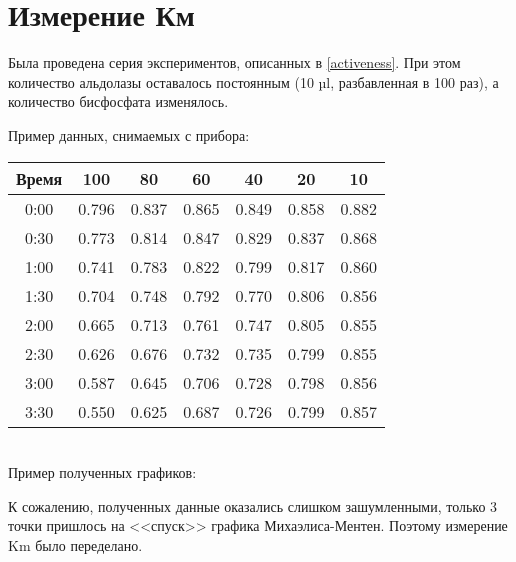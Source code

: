 \section{Измерение Км}
\label{Km-10}

Была проведена серия экспериментов, описанных в \ref{activeness}.
При этом количество альдолазы оставалось постоянным (10 µl, разбавленная в 100 раз),
а количество бисфосфата изменялось.

\def\svgwidth{\linewidth}

Пример данных, снимаемых с прибора:

\begin{tabular}{|c|c|c|c|c|c|c|}
\hline
Время & 100   &  80   &   60  & 40   & 20   &  10  \\
\hline
0:00  & 0.796 & 0.837 & 0.865 &0.849 &0.858 &0.882 \\
0:30  & 0.773 & 0.814 & 0.847 &0.829 &0.837 &0.868 \\
1:00  & 0.741 & 0.783 & 0.822 &0.799 &0.817 &0.860 \\
1:30  & 0.704 & 0.748 & 0.792 &0.770 &0.806 &0.856 \\
2:00  & 0.665 & 0.713 & 0.761 &0.747 &0.805 &0.855 \\
2:30  & 0.626 & 0.676 & 0.732 &0.735 &0.799 &0.855 \\
3:00  & 0.587 & 0.645 & 0.706 &0.728 &0.798 &0.856 \\
3:30  & 0.550 & 0.625 & 0.687 &0.726 &0.799 &0.857 \\
\hline
\end{tabular}\\

Пример полученных графиков:





К сожалению, полученных данные оказались слишком зашумленными,
только 3 точки пришлось на <<спуск>> графика Михаэлиса-Ментен.
Поэтому измерение Km было переделано.

